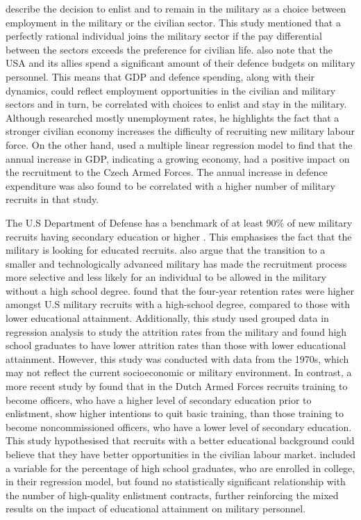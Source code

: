 \textcite{warner_chapter_1995} describe the decision to enlist and to remain in the military
as a choice between employment in the military or the civilian sector. This study 
mentioned that a perfectly rational individual joins the military sector if the pay
differential between the sectors exceeds the preference for civilian life. \textcite{warner_chapter_1995} 
also note that the USA and its allies spend a significant amount of 
their defence budgets on military personnel. This means that GDP and defence spending, 
along with their dynamics, could reflect employment opportunities in the civilian and 
military sectors and in turn, be correlated with choices to enlist and stay in the military.
Although \textcite{backstrom_are_2019} researched mostly unemployment rates, he highlights 
the fact that a stronger civilian economy increases the difficulty of recruiting new military 
labour force. On the other hand, \textcite{holcner_military_2021} used a multiple linear 
regression model to find that the annual 
increase in GDP, indicating a growing economy, had a positive impact on the recruitment to the 
Czech Armed Forces. The annual increase in defence expenditure was also found to be 
correlated with a higher number of military recruits in that study.

The U.S Department of Defense has a benchmark of at least 90\% of new military recruits 
having secondary education or higher \parencite{cnas_resources_and_force_readiness_division_fiscal_nodate}.
This emphasises the fact that the military is looking for educated recruits. \textcite{asoni_rich_2013} 
also argue that the transition to a smaller and technologically advanced military has 
made the recruitment process more selective and less likely for an individual to 
be allowed in the military without a high school degree. \textcite{elster_study_1982} 
found that the four-year retention rates were higher amongst U.S military recruits 
with a high-school degree, compared to those with lower educational attainment. Additionally,
this study used grouped data in regression analysis to study the attrition rates from the military 
and found high school graduates to have lower attrition rates than those with lower 
educational attainment.
However, this study was conducted with data from the 1970s, which may not reflect the current 
socioeconomic or military environment. 
In contrast, a more recent study by \textcite{hof_quality_2023} found that in the 
Dutch Armed Forces recruits training to become officers, who have a higher level of 
secondary education prior to enlistment, show higher intentions to quit basic training, 
than those training to become noncommissioned officers, who have a lower level of 
secondary education. This study hypothesised that recruits with a better educational 
background could believe that they have better opportunities in the civilian labour market.
\textcite{asch_cash_2010} included a variable for the percentage of high school graduates,
who are enrolled in college, in their regression model, but found no statistically significant
relationship with the number of high-quality enlistment contracts, further reinforcing the 
mixed results on the impact of educational attainment on military personnel.

